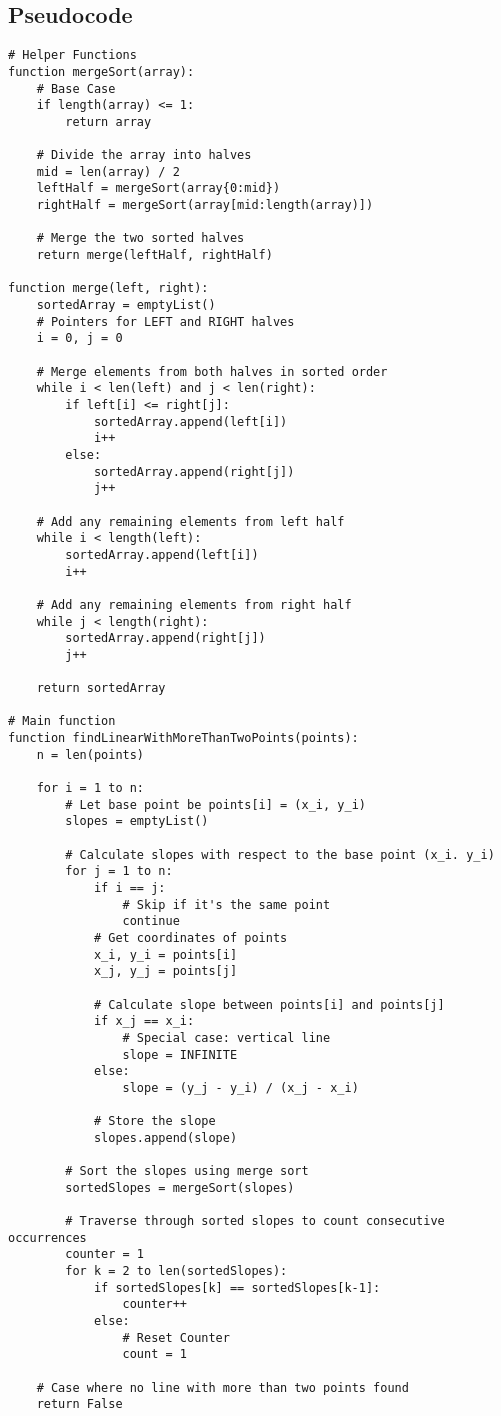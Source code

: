 \documentclass{article}
\begin{document}
\subsection*{Pseudocode}
\begin{verbatim}
# Helper Functions
function mergeSort(array):
    # Base Case
    if length(array) <= 1:
        return array

    # Divide the array into halves
    mid = len(array) / 2
    leftHalf = mergeSort(array{0:mid})
    rightHalf = mergeSort(array[mid:length(array)])

    # Merge the two sorted halves
    return merge(leftHalf, rightHalf)

function merge(left, right):
    sortedArray = emptyList()
    # Pointers for LEFT and RIGHT halves
    i = 0, j = 0 

    # Merge elements from both halves in sorted order
    while i < len(left) and j < len(right):
        if left[i] <= right[j]:
            sortedArray.append(left[i])
            i++
        else: 
            sortedArray.append(right[j])
            j++
            
    # Add any remaining elements from left half
    while i < length(left):
        sortedArray.append(left[i])
        i++

    # Add any remaining elements from right half
    while j < length(right):
        sortedArray.append(right[j])
        j++

    return sortedArray

# Main function           
function findLinearWithMoreThanTwoPoints(points):
    n = len(points)

    for i = 1 to n:
        # Let base point be points[i] = (x_i, y_i)
        slopes = emptyList() 

        # Calculate slopes with respect to the base point (x_i. y_i)
        for j = 1 to n:
            if i == j:  
                # Skip if it's the same point
                continue
            # Get coordinates of points
            x_i, y_i = points[i]
            x_j, y_j = points[j]

            # Calculate slope between points[i] and points[j]
            if x_j == x_i:
                # Special case: vertical line 
                slope = INFINITE
            else:
                slope = (y_j - y_i) / (x_j - x_i)

            # Store the slope
            slopes.append(slope)

        # Sort the slopes using merge sort
        sortedSlopes = mergeSort(slopes)

        # Traverse through sorted slopes to count consecutive occurrences
        counter = 1 
        for k = 2 to len(sortedSlopes):
            if sortedSlopes[k] == sortedSlopes[k-1]:
                counter++
            else:
                # Reset Counter
                count = 1

    # Case where no line with more than two points found
    return False 
  
\end{verbatim}
\end{document}
